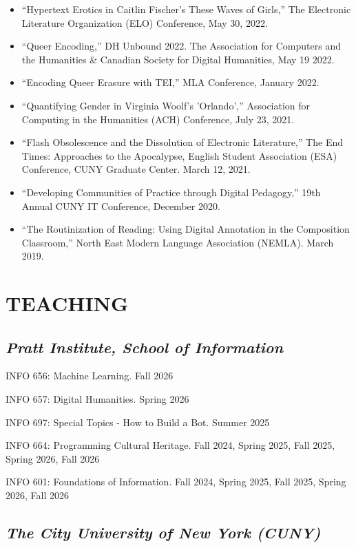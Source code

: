 \documentclass[a4paper,11pt]{article}
\begin{document}
\begin{itemize}
Conference, December 15-16, 2022.
\item ``Hypertext Erotics in Caitlin Fischer’s These Waves of Girls,'' The
Electronic Literature Organization (ELO) Conference, May 30, 2022.
\item ``Queer Encoding,'' DH Unbound 2022. The Association for Computers
and the Humanities \& Canadian Society for Digital Humanities, May
19 2022.
\item ``Encoding Queer Erasure with TEI,'' MLA Conference, January 2022.
\item ``Quantifying Gender in Virginia Woolf's 'Orlando','' Association
for Computing in the Humanities (ACH) Conference, July 23, 2021.
\item ``Flash Obsolescence and the Dissolution of Electronic Literature,''
The End Times: Approaches to the Apocalypse, English Student
Association (ESA) Conference, CUNY Graduate Center. March 12, 2021.
\item ``Developing Communities of Practice through Digital Pedagogy,''
19th Annual CUNY IT Conference, December 2020.
\item ``The Routinization of Reading: Using Digital Annotation in the
Composition Classroom,'' North East Modern Language Association
(NEMLA). March 2019.
\end{itemize}

\section*{TEACHING}
\label{sec:orgdabb75c}
\subsection*{\emph{Pratt Institute, School of Information}}
\label{sec:orgf434a9b}

INFO 656: Machine Learning. Fall 2026

INFO 657: Digital Humanities. Spring 2026

INFO 697: Special Topics - How to Build a Bot. Summer 2025

INFO 664: Programming Cultural Heritage. Fall 2024, Spring 2025,
Fall 2025, Spring 2026, Fall 2026

INFO 601: Foundations of Information. Fall 2024, Spring 2025, Fall
2025, Spring 2026, Fall 2026

\subsection*{\emph{The City University of New York (CUNY)}}
\label{sec:orgf24ecae}
\end{document}
